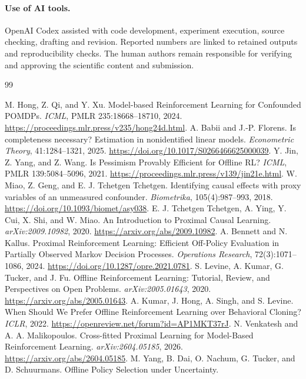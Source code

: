 \documentclass[11pt]{article}
\begin{document}
\paragraph{Use of AI tools.}
OpenAI Codex assisted with code development, experiment execution, source
checking, drafting and revision. Reported numbers are linked to retained
outputs and reproducibility checks. The human authors remain responsible for
verifying and approving the scientific content and submission.

\begin{thebibliography}{99}
\raggedright
{} M. Hong, Z. Qi, and Y. Xu.
Model-based Reinforcement Learning for Confounded POMDPs.
\emph{ICML}, PMLR 235:18668--18710, 2024.
\url{https://proceedings.mlr.press/v235/hong24d.html}.
 A. Babii and J.-P. Florens.
Is completeness necessary? Estimation in nonidentified linear models.
\emph{Econometric Theory}, 41:1284--1321, 2025.
\url{https://doi.org/10.1017/S0266466625000039}.
 Y. Jin, Z. Yang, and Z. Wang.
Is Pessimism Provably Efficient for Offline RL?
\emph{ICML}, PMLR 139:5084--5096, 2021.
\url{https://proceedings.mlr.press/v139/jin21e.html}.
 W. Miao, Z. Geng, and E. J. Tchetgen Tchetgen.
Identifying causal effects with proxy variables of an unmeasured confounder.
\emph{Biometrika}, 105(4):987--993, 2018.
\url{https://doi.org/10.1093/biomet/asy038}.
 E. J. Tchetgen Tchetgen, A. Ying, Y. Cui, X. Shi, and W. Miao.
An Introduction to Proximal Causal Learning.
\emph{arXiv:2009.10982}, 2020.
\url{https://arxiv.org/abs/2009.10982}.
 A. Bennett and N. Kallus.
Proximal Reinforcement Learning: Efficient Off-Policy Evaluation in Partially
Observed Markov Decision Processes.
\emph{Operations Research}, 72(3):1071--1086, 2024.
\url{https://doi.org/10.1287/opre.2021.0781}.
 S. Levine, A. Kumar, G. Tucker, and J. Fu.
Offline Reinforcement Learning: Tutorial, Review, and Perspectives on Open Problems.
\emph{arXiv:2005.01643}, 2020.
\url{https://arxiv.org/abs/2005.01643}.
 A. Kumar, J. Hong, A. Singh, and S. Levine.
When Should We Prefer Offline Reinforcement Learning over Behavioral Cloning?
\emph{ICLR}, 2022.
\url{https://openreview.net/forum?id=AP1MKT37rJ}.
 N. Venkatesh and A. A. Malikopoulos.
Cross-fitted Proximal Learning for Model-Based Reinforcement Learning.
\emph{arXiv:2604.05185}, 2026.
\url{https://arxiv.org/abs/2604.05185}.
 M. Yang, B. Dai, O. Nachum, G. Tucker, and D. Schuurmans.
Offline Policy Selection under Uncertainty.

\end{thebibliography}
\end{document}
